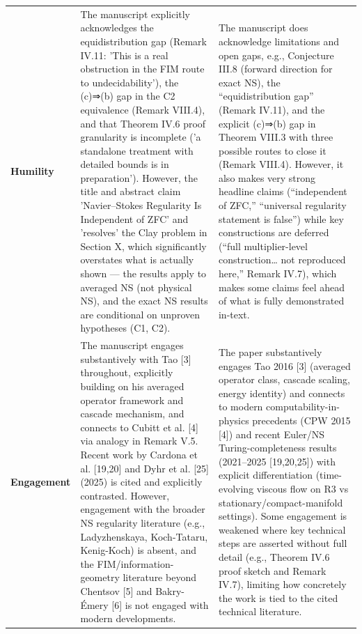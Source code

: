 \documentclass[11pt]{article}
\begin{document}
\begin{longtable}{@{} p{2.2cm} p{6.3cm} p{6.3cm} @{}}
\rowcolor{rowgray}
\textbf{Humility} &
The manuscript explicitly acknowledges the equidistribution gap (Remark IV.11: 'This is a real obstruction in the FIM route to undecidability'), the (c)⇒(b) gap in the C2 equivalence (Remark VIII.4), and that Theorem IV.6 proof granularity is incomplete ('a standalone treatment with detailed bounds is in preparation'). However, the title and abstract claim 'Navier–Stokes Regularity Is Independent of ZFC' and 'resolves' the Clay problem in Section X, which significantly overstates what is actually shown — the results apply to averaged NS (not physical NS), and the exact NS results are conditional on unproven hypotheses (C1, C2). &
The manuscript does acknowledge limitations and open gaps, e.g., Conjecture III.8 (forward direction for exact NS), the “equidistribution gap” (Remark IV.11), and the explicit (c)⇒(b) gap in Theorem VIII.3 with three possible routes to close it (Remark VIII.4). However, it also makes very strong headline claims (“independent of ZFC,” “universal regularity statement is false”) while key constructions are deferred (“full multiplier-level construction… not reproduced here,” Remark IV.7), which makes some claims feel ahead of what is fully demonstrated in-text. \\[6pt]

\textbf{Engagement} &
The manuscript engages substantively with Tao [3] throughout, explicitly building on his averaged operator framework and cascade mechanism, and connects to Cubitt et al. [4] via analogy in Remark V.5. Recent work by Cardona et al. [19,20] and Dyhr et al. [25] (2025) is cited and explicitly contrasted. However, engagement with the broader NS regularity literature (e.g., Ladyzhenskaya, Koch-Tataru, Kenig-Koch) is absent, and the FIM/information-geometry literature beyond Chentsov [5] and Bakry-Émery [6] is not engaged with modern developments. &
The paper substantively engages Tao 2016 [3] (averaged operator class, cascade scaling, energy identity) and connects to modern computability-in-physics precedents (CPW 2015 [4]) and recent Euler/NS Turing-completeness results (2021–2025 [19,20,25]) with explicit differentiation (time-evolving viscous flow on R3 vs stationary/compact-manifold settings). Some engagement is weakened where key technical steps are asserted without full detail (e.g., Theorem IV.6 proof sketch and Remark IV.7), limiting how concretely the work is tied to the cited technical literature. \\[6pt]


\end{longtable}
\end{document}

